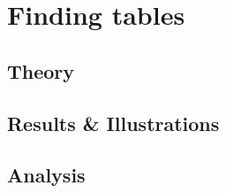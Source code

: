 \section{Finding tables}
\subsection{Theory}
\subsection{Results \& Illustrations}
\subsection{Analysis}